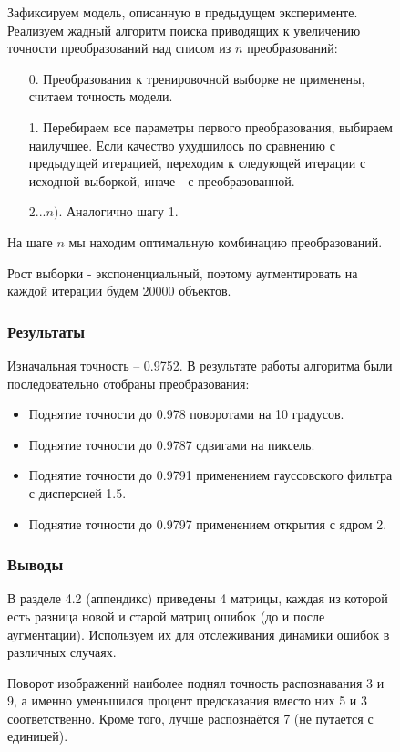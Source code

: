 \documentclass{article}
\begin{document}
\begin{figure}[H]
                Зафиксируем модель, описанную в предыдущем эксперименте.
                Реализуем жадный алгоритм поиска приводящих к увеличению точности преобразований над списом из $n$ преобразований:
                \begin{enumerate}
                    \item[0.] Преобразования к тренировочной выборке не применены, считаем точность модели.
                    \item[1.] Перебираем все параметры первого преобразования, выбираем наилучшее. Если качество ухудшилось по сравнению с предыдущей итерацией, переходим к следующей итерации с исходной выборкой, иначе - с преобразованной.
                    \item[$2...n)$.] Аналогично шагу 1.
                \end{enumerate}
                На шаге $n$ мы находим оптимальную комбинацию преобразований.

                Рост выборки - экспоненциальный, поэтому аугментировать на каждой итерации будем 20000 объектов.
            \subsubsection{Результаты}
                Изначальная точность -- 0.9752. В результате работы алгоритма были последовательно отобраны преобразования:
                \begin{itemize}
                    \item Поднятие точности до 0.978 поворотами на 10 градусов.
                    \item Поднятие точности до 0.9787 сдвигами на пиксель.
                    \item Поднятие точности до 0.9791 применением гауссовского фильтра с дисперсией 1.5.
                    \item Поднятие точности до 0.9797 применением открытия с ядром 2.
                \end{itemize}
                
            \subsubsection{Выводы}
                В разделе 4.2 (аппендикс) приведены 4 матрицы, каждая из которой есть разница новой и старой матриц ошибок (до и после аугментации). Используем их для отслеживания динамики ошибок в различных случаях.

                Поворот изображений наиболее поднял точность распознавания 3 и 9, а именно уменьшился процент предсказания вместо них 5 и 3 соответственно. Кроме того, лучше распознаётся 7 (не путается с единицей).


\end{figure}
\end{document}

